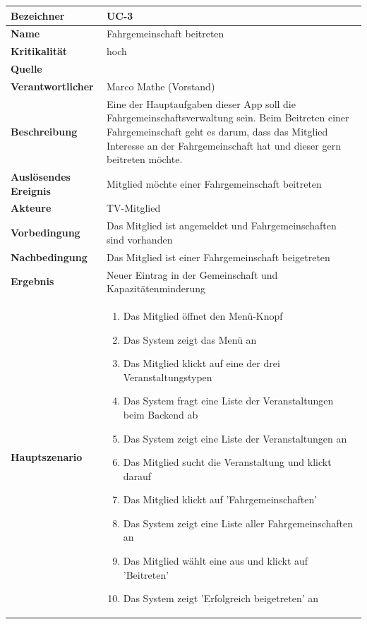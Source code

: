 \begin{table}[ht]
\centering
  \begin{tabular}{ l | p{10cm} }
	\hline
	\rowcolor{gray}
	\textbf{Bezeichner}		&	\textbf{UC-3}\\ \hline
	\textbf{Name}			&	Fahrgemeinschaft beitreten\\ \hline
	\textbf{Kritikalität}		&	hoch\\ \hline
	\textbf{Quelle}			&	\glossarmark{Stakeholder}\\ \hline
	\textbf{Verantwortlicher}	&	Marco Mathe (Vorstand)\\ \hline
	\textbf{Beschreibung}	&	Eine der Hauptaufgaben dieser App soll die Fahrgemeinschaftsverwaltung sein. Beim Beitreten einer Fahrgemeinschaft geht es darum, dass das Mitglied Interesse an der Fahrgemeinschaft hat und dieser gern beitreten möchte.\\ \hline
	\textbf{Auslösendes Ereignis}&	Mitglied möchte einer Fahrgemeinschaft beitreten\\ \hline
	\textbf{Akteure}		&	TV-Mitglied\\ \hline
	\textbf{Vorbedingung}	&	Das Mitglied ist angemeldet und Fahrgemeinschaften sind vorhanden\\ \hline
	\textbf{Nachbedingung}	&	Das Mitglied ist einer Fahrgemeinschaft beigetreten\\ \hline
	\textbf{Ergebnis}		&	Neuer Eintrag in der Gemeinschaft und Kapazitätenminderung\\ \hline
	\textbf{Hauptszenario}	&	\begin{enumerate}
					\item Das Mitglied öffnet den Menü-Knopf
					\item Das System zeigt das Menü an
					\item Das Mitglied klickt auf eine der drei Veranstaltungstypen
					\item Das System fragt eine Liste der Veranstaltungen beim Backend ab
					\item Das System zeigt eine Liste der Veranstaltungen an
					\item Das Mitglied sucht die Veranstaltung und klickt darauf
					\item Das Mitglied klickt auf 'Fahrgemeinschaften'
					\item Das System zeigt eine Liste aller Fahrgemeinschaften an
					\item Das Mitglied wählt eine aus und klickt auf 'Beitreten'
					\item Das System zeigt 'Erfolgreich beigetreten' an

\end{enumerate}
\end{tabular}
\end{table}
